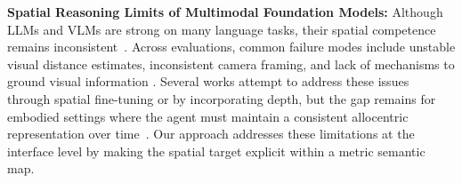 \noindent\textbf{Spatial Reasoning Limits of Multimodal Foundation Models:}
Although LLMs and VLMs are strong on many language tasks, their spatial competence remains inconsistent~\cite{vsiBench,frameOfReferenceAmbiguity,spatialRGPT, 3dsrbench}. Across evaluations, common failure modes include unstable visual distance estimates, inconsistent camera framing, and lack of mechanisms to ground visual information \cite{frameOfReferenceAmbiguity, 3dsrbench}.
Several works attempt to address these issues through spatial fine-tuning or by incorporating depth, but the gap  remains for embodied settings where the agent must maintain a consistent allocentric representation over time~\cite{vsiBench,spatialRGPT, 3dsrbench}. Our approach addresses these limitations at the interface level by making the spatial target explicit within a metric semantic map.


